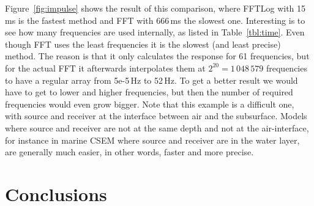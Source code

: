 \documentclass[manuscript,revised]{geophysics}
\begin{document}
Figure~\ref{fig:impulse} shows the result of this comparison, where FFTLog with
15\,ms is the fastest method and FFT with 666\,ms the slowest one. Interesting
is to see how many frequencies are used internally, as listed in
Table~\ref{tbl:time}.
%
%
%
Even though FFT uses the least frequencies it is the slowest (and least
precise) method. The reason is that it only calculates the response for 61
frequencies, but for the actual FFT it afterwards interpolates them at $2^{20}
= 1\,048\,579$ frequencies to have a regular array from 5e-5\,Hz to 52\,Hz. To
get a better result we would have to get to lower and higher frequencies, but
then the number of required frequencies would even grow bigger. Note that this
example is a difficult one, with source and receiver at the interface between
air and the subsurface. Models where source and receiver are not at the same
depth and not at the air-interface, for instance in marine CSEM where source
and receiver are in the water layer, are generally much easier, in other words,
faster and more precise.
%
%

\section{Conclusions}
\end{document}
